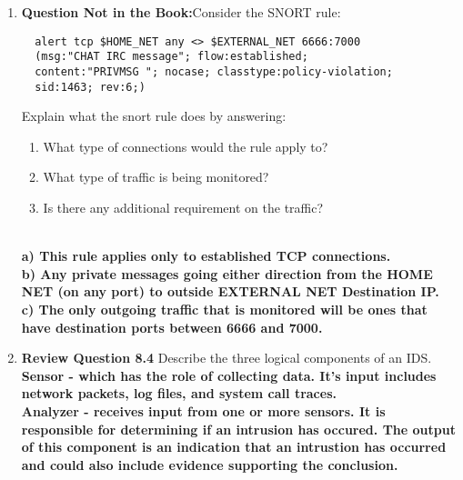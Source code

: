 \documentclass[12pt]{article}
\begin{document}
\renewcommand{\headrulewidth}{0.4pt}
\vspace{-3mm}
\begin{enumerate}
  \item \textbf{Question Not in the Book:}Consider the SNORT rule:
  \vspace{-1em}

  {\color{blue}
  \begin{verbatim}
  alert tcp $HOME_NET any <> $EXTERNAL_NET 6666:7000
  (msg:"CHAT IRC message"; flow:established;
  content:"PRIVMSG "; nocase; classtype:policy-violation;
  sid:1463; rev:6;)
  \end{verbatim}
  }
   Explain what the  snort rule does by answering:
   \begin{enumerate}
     \item What type of connections would the rule apply to?
     \item What type of traffic is being monitored?
     \item Is there any additional requirement on the traffic?
   \end{enumerate} \\

  \textbf{a) This rule applies only to established TCP connections.} \\
  \textbf{b) Any private messages going either direction from the HOME NET (on any port) to outside EXTERNAL NET Destination IP.} \\
  \textbf{c) The only outgoing traffic that is monitored will be ones that have destination ports between 6666 and 7000.} \\

  \item \textbf{Review Question 8.4} Describe the three logical components of an IDS.\\

  \textbf{Sensor - which has the role of collecting data. It's input includes network packets, log files, and system call traces.} \\

  \textbf{Analyzer - receives input from one or more sensors. It is responsible for determining if an intrusion has occured. The output of this component is an indication that an intrustion has occurred and could also include evidence supporting the conclusion.} \\


\end{enumerate}
\end{document}
